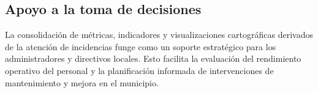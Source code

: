\subsection{Apoyo a la toma de decisiones }
La consolidación de métricas, indicadores y visualizaciones cartográficas derivados de la atención de incidencias funge como un soporte estratégico para los administradores y directivos locales. Esto facilita la evaluación del rendimiento operativo del personal y la planificación informada de intervenciones de mantenimiento y mejora en el municipio. \cite{parraestrategia}

